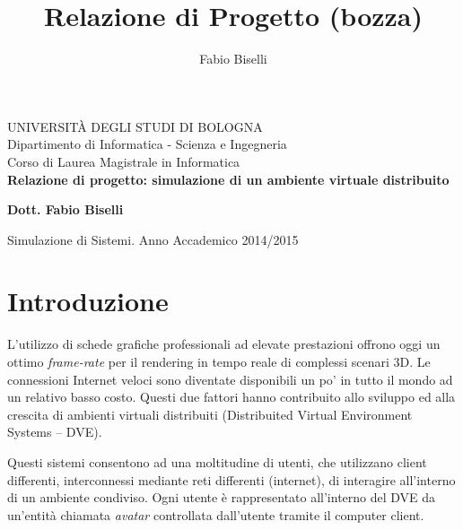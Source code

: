 \documentclass[a4paper, 11pt, oneside]{book}
\author{Fabio Biselli}
\title{Relazione di Progetto (bozza)}
\date{}
\theoremstyle{definition}
\theoremstyle{remark}
\begin{document}
\begin{titlepage}

\begin{center}
\Large UNIVERSIT\`A DEGLI STUDI DI BOLOGNA\\
Dipartimento di Informatica - Scienza e Ingegneria\\
\bigskip
\Large Corso di Laurea Magistrale in Informatica\\
\vspace{100pt}
\huge \textbf{Relazione di progetto: simulazione di un
ambiente virtuale distribuito}
\end{center}

\vspace{100pt}
\large
\begin{center}
\textbf{Dott. Fabio Biselli}
\end{center}
\normalsize
\bigskip
\begin{center}
Simulazione di Sistemi. Anno Accademico 2014/2015
\end{center}
\end{titlepage}

\tableofcontents

\chapter{Introduzione}
L'utilizzo di schede grafiche professionali ad elevate prestazioni offrono
oggi un ottimo \emph{frame-rate} per il rendering in tempo reale di complessi
scenari 3D. Le connessioni Internet veloci sono diventate disponibili un po'
in tutto il mondo ad un relativo basso costo.
Questi due fattori hanno contribuito allo sviluppo ed alla crescita di ambienti
virtuali distribuiti (Distribuited Virtual Environment Systems -- DVE).

Questi sistemi consentono ad una moltitudine di utenti, che utilizzano
client differenti, interconnessi mediante reti differenti (internet), di
interagire all'interno di un ambiente condiviso. Ogni utente è rappresentato
all'interno del DVE da un'entità chiamata \emph{avatar} controllata dall'utente
tramite il computer client.
\end{document}
